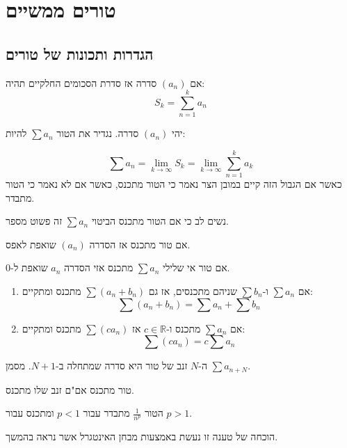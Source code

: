 \documentclass{tstextbook}
\begin{document}
\chapter{טורים ממשיים}

\section{הגדרות ותכונות של טורים}

\begin{definition}
אם \((a_{n})\) סדרה אז סדרת הסכומים החלקיים תהיה:
$$S_{k}=\sum_{n=1}^{k} a_{n}$$

\end{definition}
\begin{definition}[טור]
יהי \((a_{n})\) סדרה. נגדיר את הטור \(\sum a_{n}\) להיות:

\end{definition}
$$\sum a_{n}=\lim_{ k \to \infty } S_{k}=\lim_{ k \to \infty } \sum_{n=1}^{k} a_{k}$$
כאשר אם הגבול הזה קיים במובן הצר נאמר כי הטור מתכנס, כאשר אם לא נאמר כי הטור מתבדר.

\begin{remark}
נשים לב כי אם הטור מתכנס הביטוי \(\sum a_{n}\) זה פשוט מספר.

\end{remark}
\begin{proposition}
אם טור מתכנס אז הסדרה \((a_{n})\) שואפת לאפס.

\end{proposition}
\begin{proposition}
אם טור אי שלילי \(\sum a_{n}\) מתכנס אזי הסדרה \(a_{n}\) שואפת ל-0.

\end{proposition}
\begin{proposition}
  \begin{enumerate}
    \item אם \(\sum a_{n}\) ו-\(\sum b_{n}\) שניהם מתכנסים, אז גם \(\sum(a_{n}+b_{n})\) מתכנס ומתקיים: 
$$\sum (a_{n}+b_{n})=\sum a_{n}+\sum b_{n}$$


    \item אם \(\sum a_{n}\) מתכנס ו-\(c \in \mathbb{R}\) אז \(\sum(ca_{n})\) מתכנס ומתקיים: 
$$\sum(c a_{n})=c \sum a_{n}$$


  \end{enumerate}
\end{proposition}
\begin{definition}
ה-\(N\) זנב של טור היא סדרה שמתחלה ב-\(N+1\). מסמן \(\sum a_{n+N}\).

\end{definition}
\begin{proposition}
טור מתכנס אם"ם זנב שלו מתכנס.

\end{proposition}
\begin{proposition}
הטור \(\frac{1}{n^{p}}\) מתבדר עבור \(p<1\) ומתכנס עבור \(p>1\).

\end{proposition}
הוכחה של טענה זו נעשת באמצעות מבחן האינטגרל אשר נראה בהמשך.
\end{document}
